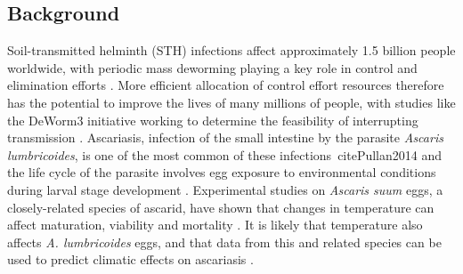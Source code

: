 \subsection{Background}

Soil-transmitted helminth (STH) infections affect approximately 1.5 billion people worldwide, with periodic mass deworming playing a key role in control and elimination efforts \cite{Pullan2014}. More efficient allocation of control effort resources therefore has the potential to improve the lives of many millions of people, with studies like the DeWorm3 initiative working to determine the feasibility of interrupting transmission \cite{Deworm3}. Ascariasis, infection of the small intestine by the parasite \textit{Ascaris lumbricoides}, is one of the most common of these infections\ cite{Pullan2014} and the life cycle of the parasite involves egg exposure to environmental conditions during larval stage development \cite{WHO}. Experimental studies on \textit{Ascaris suum} eggs, a closely-related species of ascarid, have shown that changes in temperature can affect maturation, viability and mortality \cite{Wagner,Arene,Kim,Caldwell1928}. It is likely that temperature also affects \textit{A. lumbricoides} eggs, and that data from this and related species can be used to predict climatic effects on ascariasis \cite{Boes,Johnson,Cruz}.

